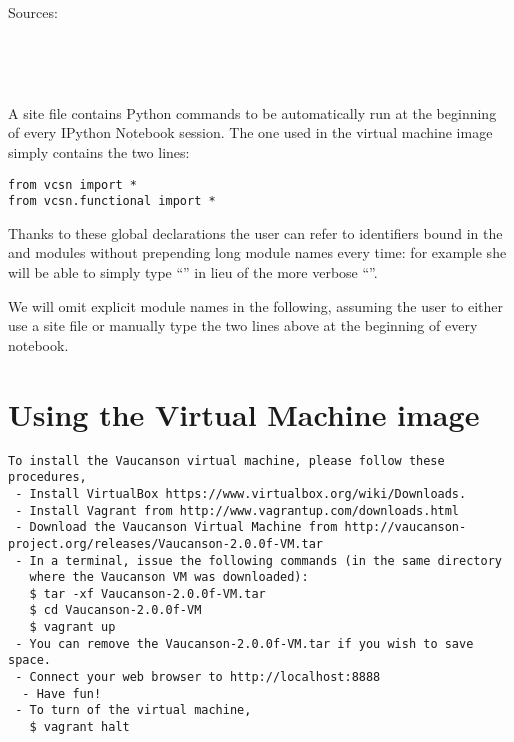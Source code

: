 \FILL



Sources:

\\

\\

A site file contains Python commands to be automatically run at the beginning
of every IPython Notebook session.  The one used in the virtual machine image
simply contains the two lines:
\begin{lstlisting}
from vcsn import *
from vcsn.functional import *
\end{lstlisting}
Thanks to these global declarations the user can refer to identifiers bound in
the  and  modules without prepending long module
names every time: for example she will be able to simply type
``''
in lieu of the more verbose
``''.

We will omit explicit module names in the following, assuming the user to
either use a site file or manually type the two  lines above at
the beginning of every notebook.



\section{Using the Virtual Machine image}

\begin{lstlisting}
To install the Vaucanson virtual machine, please follow these procedures,
 - Install VirtualBox https://www.virtualbox.org/wiki/Downloads.
 - Install Vagrant from http://www.vagrantup.com/downloads.html
 - Download the Vaucanson Virtual Machine from http://vaucanson-project.org/releases/Vaucanson-2.0.0f-VM.tar
 - In a terminal, issue the following commands (in the same directory
   where the Vaucanson VM was downloaded):
   $ tar -xf Vaucanson-2.0.0f-VM.tar
   $ cd Vaucanson-2.0.0f-VM
   $ vagrant up
 - You can remove the Vaucanson-2.0.0f-VM.tar if you wish to save space.
 - Connect your web browser to http://localhost:8888
  - Have fun!
 - To turn of the virtual machine,
   $ vagrant halt
\end{lstlisting}

